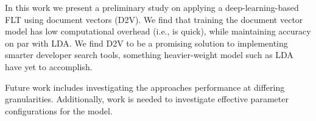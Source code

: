 
%



In this work we present a preliminary study on applying a deep-learning-based
FLT using document vectors (D2V). We find that training the document vector
model has low computational overhead (i.e., is quick), while maintaining
accuracy on par with LDA. We find D2V to be a promising solution to implementing
smarter developer search tools, something heavier-weight model such as LDA have
yet to accomplish.

Future work includes investigating the approaches performance at differing granularities.
Additionally, work is needed to investigate effective parameter configurations for the model.
